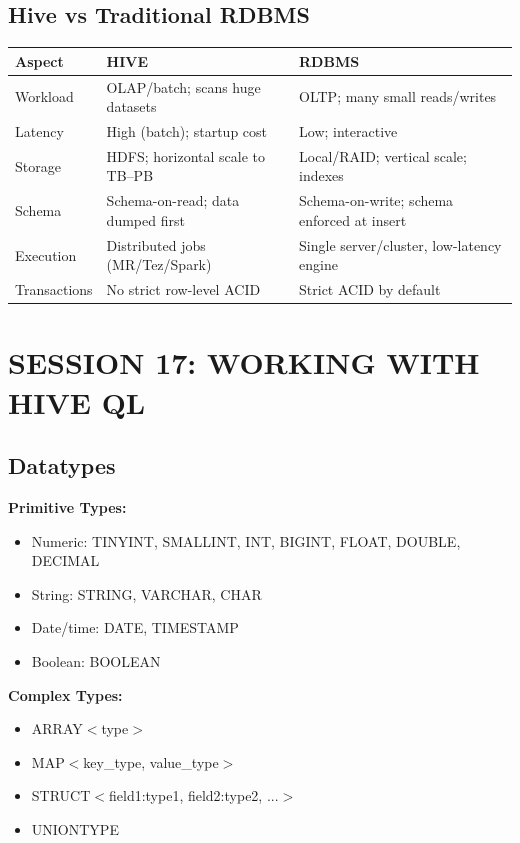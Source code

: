 \documentclass[11pt, onecolumn, a4paper]{article}
\begin{document}
\subsection{Hive vs Traditional RDBMS}

\begin{center}
\begin{tabular}{|l|p{3cm}|p{3cm}|}
\hline
\textbf{Aspect} & \textbf{HIVE} & \textbf{RDBMS} \\
\hline
Workload & OLAP/batch; scans huge datasets & OLTP; many small reads/writes \\
\hline
Latency & High (batch); startup cost & Low; interactive \\
\hline
Storage & HDFS; horizontal scale to TB--PB & Local/RAID; vertical scale; indexes \\
\hline
Schema & Schema-on-read; data dumped first & Schema-on-write; schema enforced at insert \\
\hline
Execution & Distributed jobs (MR/Tez/Spark) & Single server/cluster, low-latency engine \\
\hline
Transactions & No strict row-level ACID & Strict ACID by default \\
\hline
\end{tabular}
\end{center}

\newpage
\section{SESSION 17: WORKING WITH HIVE QL}

\subsection{Datatypes}

\textbf{Primitive Types:}
\begin{itemize}
  \item Numeric: TINYINT, SMALLINT, INT, BIGINT, FLOAT, DOUBLE, DECIMAL
  \item String: STRING, VARCHAR, CHAR
  \item Date/time: DATE, TIMESTAMP
  \item Boolean: BOOLEAN
\end{itemize}

\textbf{Complex Types:}
\begin{itemize}
  \item ARRAY$<$type$>$
  \item MAP$<$key\_type, value\_type$>$
  \item STRUCT$<$field1:type1, field2:type2, ...$>$
  \item UNIONTYPE
\end{itemize}
\end{document}
